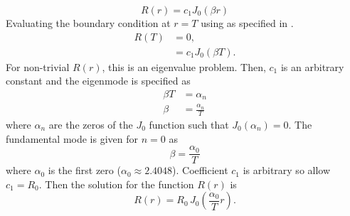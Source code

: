   \begin{equation}
    \label{eq:finite_cyl_j0}
    R(r) = c_1 J_0(\beta r)
  \end{equation}
  Evaluating the boundary condition at $r=T$ using  as
  specified in .
  \begin{align}
    R(T) &= 0, \\
    &= c_1 J_0(\beta T).
  \end{align}
  For non-trivial $R(r)$, this is an eigenvalue problem. Then, $c_1$ is an
  arbitrary constant and the eigenmode is specified as
  \begin{align}
    \beta T &= \alpha_n \\
    \beta &= \frac{\alpha_n}{T} 
  \end{align}
  where $\alpha_n$ are the zeros of the $J_0$ function such that $J_0(\alpha_n)
  = 0$. The fundamental mode is given for $n=0$ as
  \begin{equation}
    \label{eq:finite_cyl_beta}
    \beta = \frac{\alpha_0}{T}
  \end{equation}
  where $\alpha_0$ is the first zero ($\alpha_0 \approx 2.4048$). Coefficient
  $c_1$ is arbitrary so allow $c_1 = R_0$. Then the solution for the function 
  $R(r)$ is
  \begin{equation}
    \label{eq:finite_cyl_R}
    R(r) = R_0 \, J_0\left(\frac{\alpha_0}{T} r\right).
  \end{equation}

